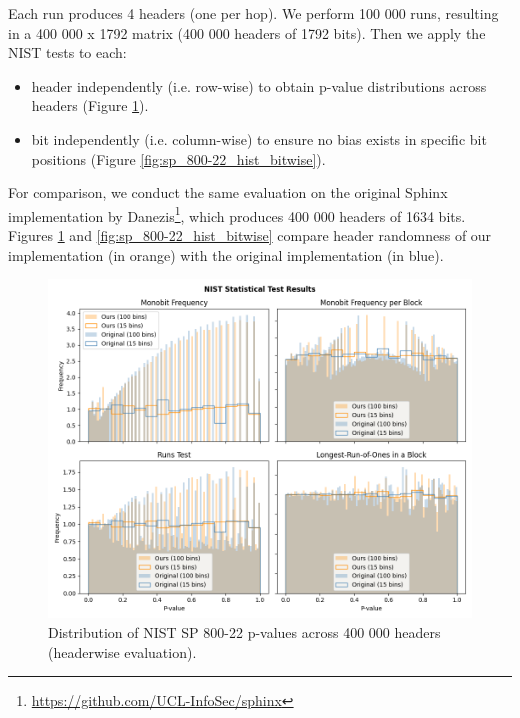 Each run produces 4 headers (one per hop).
We perform 100 000 runs, resulting in a 400 000 x 1792 matrix (400 000 headers of 1792 bits).
Then we apply the NIST tests to each:
\begin{itemize}
    \item header independently (i.e. row-wise) to obtain p-value distributions across headers (Figure \ref{fig:sp_800-22_hist_headerwise}).
    \item bit independently (i.e. column-wise) to ensure no bias exists in specific bit positions (Figure \ref{fig:sp_800-22_hist_bitwise}).
\end{itemize}

For comparison, we conduct the same evaluation on the original Sphinx implementation by Danezis\footnote{\href{https://github.com/UCL-InfoSec/sphinx}{https://github.com/UCL-InfoSec/sphinx}}, which produces 400 000 headers of 1634 bits. 
Figures \ref{fig:sp_800-22_hist_headerwise} and \ref{fig:sp_800-22_hist_bitwise} compare header randomness of our implementation (in orange) with the original implementation (in blue).
\begin{figure}[H]
    \centering
    \includegraphics[width=0.9\linewidth]{Images/25-05-19-runwise_comparison_400000h-20n-3m-3p5.png}
    \caption{Distribution of NIST SP 800-22 p-values across 400 000 headers (headerwise evaluation).}
    \label{fig:sp_800-22_hist_headerwise}
\end{figure}
